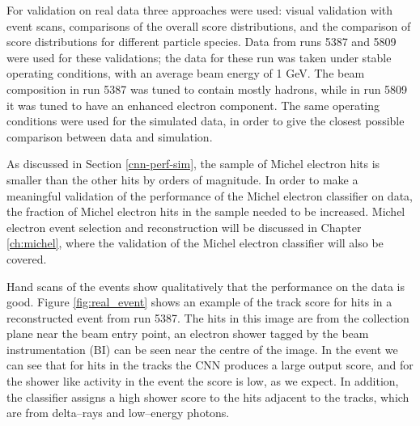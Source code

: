 For validation on real \protodune{} data three approaches were used: visual
validation with event scans, comparisons of the overall score distributions, 
and the comparison of score distributions for different particle species. Data 
from \protodune{} runs 5387 and 5809 were used for these validations; the data 
for these run was taken under stable operating conditions, with an average 
beam energy of 1 GeV. The beam composition in run 5387 was tuned to contain
mostly hadrons, while in run 5809 it was tuned to have an enhanced electron
component. The same operating conditions were used for the simulated data, in
order to give the closest possible comparison between data and simulation.

As discussed in Section \ref{cnn-perf-sim}, the sample of Michel electron hits
is smaller than the other hits by orders of magnitude. In order to make a
meaningful validation of the performance of the Michel electron classifier on
data, the fraction of Michel electron hits in the sample needed to be increased.
Michel electron event selection and reconstruction will be discussed in Chapter
\ref{ch:michel}, where the validation of the Michel electron classifier will
also be covered.

Hand scans of the events show qualitatively that the performance on the data is
good. Figure \ref{fig:real_event} shows an example of the track score for hits
in a reconstructed event from run 5387. The hits in this image are from the
collection plane near the beam entry point, an electron shower tagged by the
beam instrumentation (BI) can be seen near the centre of the image. In the event
we can see that for hits in the tracks the CNN produces a large output score,
and for the shower like activity in the event the score is low, as we expect. In
addition, the classifier assigns a high shower score to the hits adjacent to the
tracks, which are from delta--rays and low--energy photons.

